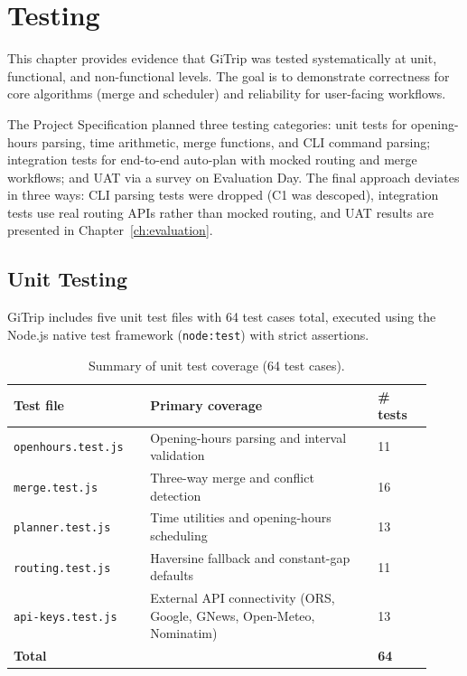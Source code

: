 \chapter{Testing}
\label{ch:testing}

This chapter provides evidence that GiTrip was tested systematically at unit,
functional, and non-functional levels. The goal is to demonstrate correctness for
core algorithms (merge and scheduler) and reliability for user-facing workflows.

The Project Specification planned three testing categories: unit tests for opening-hours parsing, time arithmetic, merge functions, and CLI command parsing; integration tests for end-to-end auto-plan with mocked routing and merge workflows; and UAT via a survey on Evaluation Day. The final approach deviates in three ways: CLI parsing tests were dropped (C1 was descoped), integration tests use real routing APIs rather than mocked routing, and UAT results are presented in Chapter~\ref{ch:evaluation}.

\section{Unit Testing}
GiTrip includes five unit test files with 64 test cases total, executed using
the Node.js native test framework (\texttt{node:test}) with strict assertions.

\begin{table}[H]
\centering
\caption{Summary of unit test coverage (64 test cases).}
\label{tab:unit_tests_summary}
\begin{tabular}{@{}p{0.30\linewidth}p{0.50\linewidth}p{0.12\linewidth}@{}}
\toprule
\textbf{Test file} & \textbf{Primary coverage} & \textbf{\# tests} \\
\midrule
\texttt{openhours.test.js} & Opening-hours parsing and interval validation & 11 \\
\texttt{merge.test.js}     & Three-way merge and conflict detection        & 16 \\
\texttt{planner.test.js}   & Time utilities and opening-hours scheduling   & 13 \\
\texttt{routing.test.js}   & Haversine fallback and constant-gap defaults  & 11 \\
\texttt{api-keys.test.js}  & External API connectivity (ORS, Google, GNews, Open-Meteo, Nominatim) & 13 \\
\midrule
\textbf{Total} &  & \textbf{64} \\
\bottomrule
\end{tabular}
\end{table}


